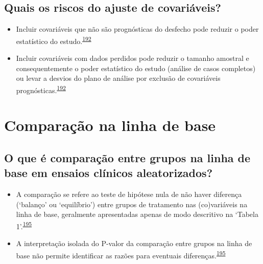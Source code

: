 \documentclass[
  a4paper,
]{book}
\begin{document}
\hypertarget{quais-os-riscos-do-ajuste-de-covariuxe1veis}{%
\subsection{Quais os riscos do ajuste de covariáveis?}\label{quais-os-riscos-do-ajuste-de-covariuxe1veis}}

\begin{itemize}
\item
  Incluir covariáveis que não são prognósticas do desfecho pode reduzir o poder estatístico do estudo.\textsuperscript{\protect\hyperlink{ref-Kahan2014}{192}}
\item
  Incluir covariáveis com dados perdidos pode reduzir o tamanho amostral e consequentemente o poder estatístico do estudo (análise de casos completos) ou levar a desvios do plano de análise por exclusão de covariáveis prognósticas.\textsuperscript{\protect\hyperlink{ref-Kahan2014}{192}}
\end{itemize}

\hypertarget{comparacao-linha-de-base}{%
\section{Comparação na linha de base}\label{comparacao-linha-de-base}}

\hypertarget{o-que-uxe9-comparauxe7uxe3o-entre-grupos-na-linha-de-base-em-ensaios-cluxednicos-aleatorizados}{%
\subsection{O que é comparação entre grupos na linha de base em ensaios clínicos aleatorizados?}\label{o-que-uxe9-comparauxe7uxe3o-entre-grupos-na-linha-de-base-em-ensaios-cluxednicos-aleatorizados}}

\begin{itemize}
\item
  A comparação se refere ao teste de hipótese nula de não haver diferença (`balanço' ou `equilíbrio') entre grupos de tratamento nas (co)variáveis na linha de base, geralmente apresentadas apenas de modo descritivo na `Tabela 1'.\textsuperscript{\protect\hyperlink{ref-Stang2018}{195}}
\item
  A interpretação isolada do P-valor da comparação entre grupos na linha de base não permite identificar as razões para eventuais diferenças.\textsuperscript{\protect\hyperlink{ref-Stang2018}{195}}
\end{itemize}
\end{document}
